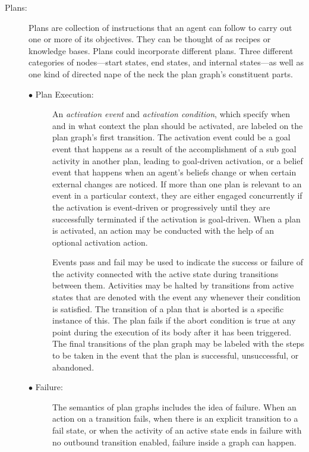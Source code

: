     \begin{description}
        \item[Plans:]
        Plans are collection of instructions that an agent can follow to carry out one or more of its objectives. They can be thought of as recipes or knowledge bases. Plans could incorporate different plans. Three different categories of nodes—start states, end states, and internal states—as well as one kind of directed nape of the neck the plan graph's constituent parts.
        
        \vspace{.5cm}
        
        \begin{description}
        \item[$\bullet$  Plan Execution:]
        An \textit{activation event} and \textit{activation condition}, which specify when and in what context the plan should be activated, are labeled on the plan graph's first transition. The activation event could be a goal event that happens as a result of the accomplishment of a sub goal activity in another plan, leading to goal-driven activation, or a belief event that happens when an agent's beliefs change or when certain external changes are noticed. If more than one plan is relevant to an event in a particular context, they are either engaged concurrently if the activation is event-driven or progressively until they are successfully terminated if the activation is goal-driven. When a plan is activated, an action may be conducted with the help of an optional activation action.
        
        \vspace{.5cm}
        
        Events pass and fail may be used to indicate the success or failure of the activity connected with the active state during transitions between them. Activities may be halted by transitions from active states that are denoted with the event any whenever their condition is satisfied. The transition of a plan that is aborted is a specific instance of this. The plan fails if the abort condition is true at any point during the execution of its body after it has been triggered. The final transitions of the plan graph may be labeled with the steps to be taken in the event that the plan is successful, unsuccessful, or abandoned.
        
        \vspace{.5cm}
        
        \item[$\bullet$  Failure:]
        The semantics of plan graphs includes the idea of failure. When an action on a transition fails, when there is an explicit transition to a fail state, or when the activity of an active state ends in failure with no outbound transition enabled, failure inside a graph can happen.
        \end{description}
    \end{description}
    
